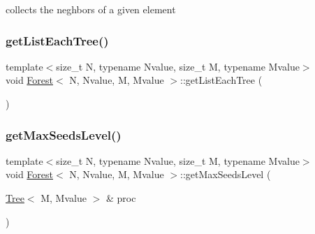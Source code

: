collects the neghbors of a given element \mbox{\label{classForest_a208c4dce0d2aeda8aa501852667290eb}} 
\subsubsection{\texorpdfstring{get\+List\+Each\+Tree()}{getListEachTree()}}
{\footnotesize\ttfamily template$<$size\+\_\+t N, typename Nvalue, size\+\_\+t M, typename Mvalue$>$ \\
void \mbox{\hyperlink{classForest}{Forest}}$<$ N, Nvalue, M, Mvalue $>$\+::get\+List\+Each\+Tree (\begin{DoxyParamCaption}{ }\end{DoxyParamCaption})}

\mbox{\label{classForest_a529db5cd59d6a488c32d5107d6bcaec9}} 
\subsubsection{\texorpdfstring{get\+Max\+Seeds\+Level()}{getMaxSeedsLevel()}}
{\footnotesize\ttfamily template$<$size\+\_\+t N, typename Nvalue, size\+\_\+t M, typename Mvalue$>$ \\
void \mbox{\hyperlink{classForest}{Forest}}$<$ N, Nvalue, M, Mvalue $>$\+::get\+Max\+Seeds\+Level (\begin{DoxyParamCaption}\item[{\mbox{\hyperlink{classTree}{Tree}}$<$ M, Mvalue $>$ \&}]{proc }\end{DoxyParamCaption})}

\mbox{\label{classForest_a6f48fa95717bacc408f688da16255b55}} 
